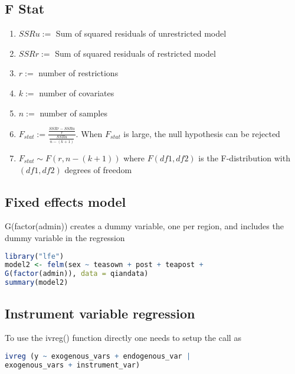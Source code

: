 \subsection {F Stat}
\begin {enumerate}
\item $SSRu := $ Sum of squared residuals of unrestricted model
\item $SSRr := $ Sum of squared residuals of restricted model
\item $r := $ number of restrictions
\item $k := $ number of covariates
\item $n := $ number of samples
\item $F_{stat} := \frac {\frac {SSRr - SSRu} {r}} {\frac {SSRu} {n - (k+1)}}$. When $F_{stat}$ is large, the null hypothesis can be rejected
\item $F_{stat} \sim F(r, n-(k+1))$ where $F(df1, df2)$ is the F-distribution with $(df1, df2)$ degrees of freedom
\end {enumerate}

\subsection {Fixed effects model} \label {r: fem}
G(factor(admin)) creates a dummy variable, one per region, and includes the dummy variable
in the regression
\begin{lstlisting}[language=R]
library("lfe")
model2 <- felm(sex ~ teasown + post + teapost + 
G(factor(admin)), data = qiandata)
summary(model2)
\end{lstlisting}

\subsection {Instrument variable regression}
To use the ivreg() function directly one needs to setup the call as
\begin{lstlisting}[language=R]
ivreg (y ~ exogenous_vars + endogenous_var | 
exogenous_vars + instrument_var)
\end{lstlisting}

